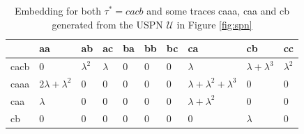 \begin{table}[!t]
\caption{Embedding for both $\tau^*=cacb$ and some traces caaa, caa and cb generated from the USPN $\mathcal{U}$ in Figure \ref{fig:spn}}\label{tb:embedding}
\begin{center}
	\begin{tabular}{l|l|l|l|l|l|l|l|l|l|}
		\toprule
		& aa    & ab   & ac    & ba   & bb   & bc & ca & cb & cc   \\
		\midrule
		cacb & $0$ & $\lambda^2$ & $\lambda$ & $0$  & $0$  & $0$ & $\lambda$ & $\lambda+\lambda^3$ & $\lambda^2$\\
		caaa & $2\lambda+\lambda^2$& $0$ & $0$ & $0$ & $0$ & $0$ & $\lambda+\lambda^2+\lambda^3$ & $0$ & $0$ \\
		caa  & $\lambda$ & $0$ & $0$ & $0$ & $0$ & $0$ & $\lambda+\lambda^2$ & $0$&  $0$\\
		cb   & $0$ & $0$ & $0$ & $0$ & $0$ & $0$ & $0$ & $\lambda$& $0$ \\
		\bottomrule
	\end{tabular}
\end{center}
\end{table}
